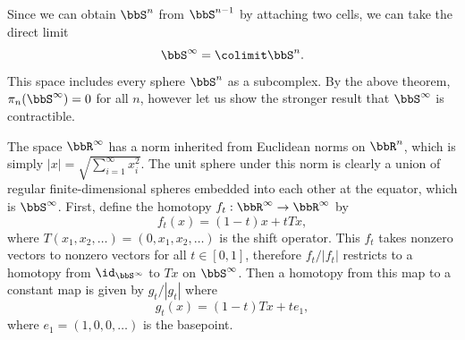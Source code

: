 \begin{example}[$\bbS^\infty$]\index{$\bbS^\infty$}\label{S-infty}
    Since we can obtain $\bbS^n$ from $\bbS^{n-1}$ by attaching two cells, we can take the direct limit
    \[\bbS^\infty=\colimit \bbS^n.\]
    This space includes every sphere $\bbS^n$ as a subcomplex. By the above theorem, $\pi_n(\bbS^\infty)=0$ for all $n$, however let us show the stronger result that $\bbS^\infty$ is contractible.

    The space $\bbR^\infty$ has a norm inherited from Euclidean norms on $\bbR^n$, which is simply $|x|=\sqrt{\sum_{i=1}^\infty x_i^2}$. The unit sphere under this norm is clearly a union of regular finite-dimensional spheres embedded into each other at the equator, which is $\bbS^\infty$. First, define the homotopy $f_t:\bbR^\infty\to \bbR^\infty$ by 
    \[f_t(x)=(1-t)x+tTx,\label{eq contracting homotopy S-inf}\]
    where $T(x_1,x_2,\ldots)=(0,x_1,x_2,\ldots)$ is the shift operator. This $f_t$ takes nonzero vectors to nonzero vectors for all $t\in[0,1]$, therefore $f_t/|f_t|$ restricts to a homotopy from $\id_{\bbS^\infty}$ to $Tx$ on $\bbS^\infty$. Then a homotopy from this map to a constant map is given by $g_t/|g_t|$ where
    \[g_t(x)=(1-t)Tx+te_1,\]
    where $e_1=(1,0,0,\ldots)$ is the basepoint.
\end{example}



